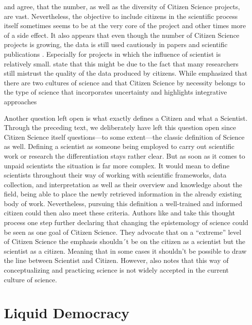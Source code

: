 \citeauthor{WigginsCrowston2011} and \citeauthor{Hakalay2014} agree, that the number, as well as the diversity of Citizen Science projects, are vast. Nevertheless, the objective to include citizens in the scientific process itself sometimes seems to be at the very core of the project and other times more of a side effect. It also appears that even though the number of Citizen Science projects is growing, the data is still used cautiously in papers and scientific publications \parencite[xx]{Hakalay2014}. Especially for projects in which the influence of scientist is relatively small. \citeauthor[xx]{FlanaginMetzger2008} state that this might be due to the fact that many researchers still mistrust the quality of the data produced by citizens. While \citeauthor[xx]{Holling1998} emphasized that there are two cultures of science and that Citizen Science by necessity belongs to the type of science that incorporates uncertainty and highlights integrative approaches \parencite[xx]{Holling1998}

Another question left open is what exactly defines a Citizen and what a Scientist. Through the preceding text, we deliberately have left this question open since Citizen Science itself questions---to some extent---the classic definition of Science as well. Defining a scientist as someone being employed to carry out scientific work or research the differentiation stays rather clear. But as soon as it comes to unpaid scientists the situation is far more complex. It would mean to define scientists throughout their way of working with scientific frameworks, data collection, and interpretation as well as their overview and knowledge about the field, being able to place the newly retrieved information in the already existing body of work. Nevertheless, pursuing this definition a well-trained and informed citizen could then also meet these criteria. Authors like \citeauthor{StilgoeLockWilsdon_2014} and \citeauthor{Irwin1995} take this thought process one step further declaring that changing the epistemology of science could be seen as one goal of Citizen Science. They advocate that on a “extreme” level of Citizen Science the emphasis shouldn´t be on the citizen as a scientist but the scientist as a citizen. Meaning that in some cases it shouldn’t be possible to draw the line between Scientist and Citizen. However, \citeauthor{Irwin1995} also notes that this way of conceptualizing and practicing science is not widely accepted in the current culture of science. \parencite[xx]{Irwin1995}


\section{Liquid Democracy}
\label{sec:Liquid_Democracy}

